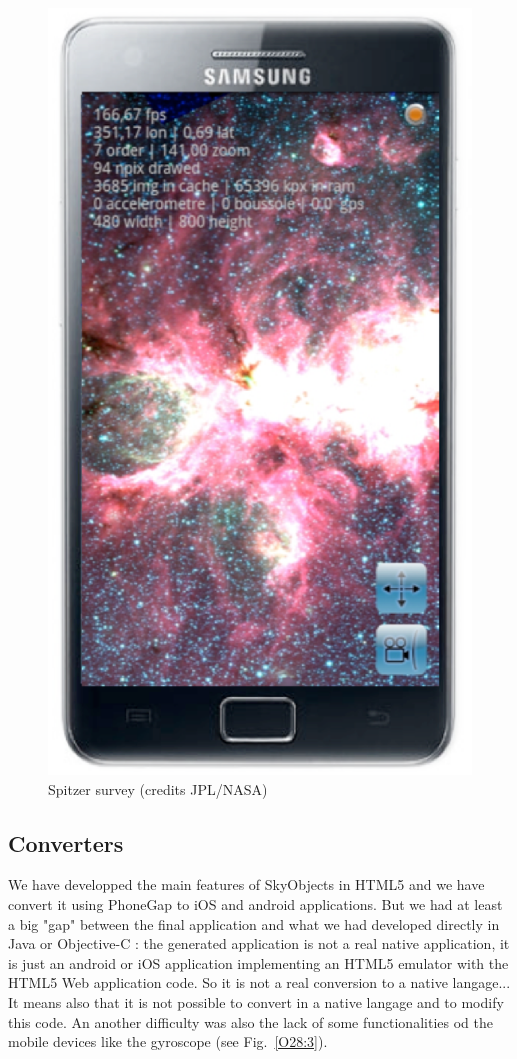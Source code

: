 \begin{figure}[h]
\includegraphics[scale=0.28]{part5/Schaaff_O28/O28_f3.eps}
\caption{Spitzer survey (credits JPL/NASA)} 
\label{O28:2}
\end{figure}

\subsection{Converters}
We have developped the main features of SkyObjects in HTML5 and we have convert it using PhoneGap to iOS and android applications. But we had at least a big "gap" between the final application and what we had developed directly in Java or Objective-C : the generated application is not a real native application, it is just an android or iOS application implementing an HTML5 emulator with the HTML5 Web application code. So it is not a real conversion to a native langage... 
It means also that it is not possible to convert in a native langage and to modify this code.
An another difficulty was also the lack of some functionalities od the mobile devices like the gyroscope  (see Fig.~\ref{O28:3}).


